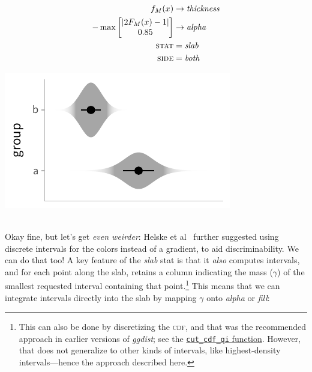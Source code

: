 \documentclass[journal]{vgtc}                     %
\newcommand{\equationfigure}[2]{%
\noindent
\begin{minipage}{.5\columnwidth}
\setlength{\abovedisplayskip}{0pt} %
\setlength{\belowdisplayskip}{0pt} %
#1\end{minipage}%
\begin{minipage}{.4\columnwidth}\centering #2 \end{minipage}%
\vspace{.5\belowdisplayskip}\\
}
\begin{document}
\equationfigure{
\begin{align*}
f_M(x) &\rightarrow \textit{thickness}\\
-\max \left[ \begin{matrix} \lvert 2 F_M(x) - 1 \rvert \\ 0.85 \end{matrix} \right] &\rightarrow \textit{alpha}\\
\textsc{stat} &= \mathit{slab}\\
\textsc{side} &= \mathit{both}
\end{align*}
}{\includegraphics[width=1.2\columnwidth]{figs/3-slab_violin_gradient.pdf}}
Okay fine, but let's get \textit{even weirder}: Helske et al~\cite{helske2021can} further suggested using discrete intervals for the colors instead of a gradient, to aid discriminability. We can do that too! A key feature of the \textit{slab} stat is that it \textit{also} computes intervals, and for each point along the slab, retains a column indicating the mass ($\gamma$) of the smallest requested interval containing that point.\footnote{This can also be done by discretizing the \textsc{cdf}, and that was the recommended approach in earlier versions of \textit{ggdist}; see the \href{https://mjskay.github.io/ggdist/reference/cut_cdf_qi.html}{\texttt{cut\_cdf\_qi} function}. However, that does not generalize to other kinds of intervals, like highest-density intervals---hence the approach described here.}  This means that we can integrate intervals directly into the slab by mapping $\gamma$ onto \textit{alpha} or \textit{fill}:
\end{document}
